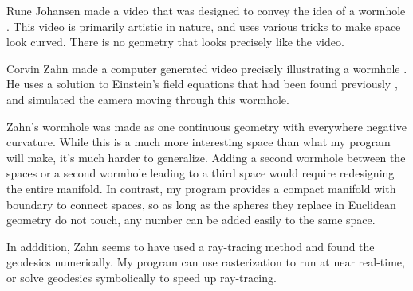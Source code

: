 Rune Johansen made a video that was designed to convey the idea of a wormhole \cite{runevision}. This video is primarily artistic in nature, and uses various tricks to make space look curved. There is no geometry that looks precisely like the video.

Corvin Zahn made a computer generated video precisely illustrating a wormhole \cite{spacetimetravel}. He uses a solution to Einstein's field equations that had been found previously \cite{WormholeSolution}, and simulated the camera moving through this wormhole.

Zahn's wormhole was made as one continuous geometry with everywhere negative curvature. While this is a much more interesting space than what my program will make, it's much harder to generalize. Adding a second wormhole between the spaces or a second wormhole leading to a third space would require redesigning the entire manifold. In contrast, my program provides a compact manifold with boundary to connect spaces, so as long as the spheres they replace in Euclidean geometry do not touch, any number can be added easily to the same space.

In adddition, Zahn seems to have used a ray-tracing method and found the geodesics numerically. My program can use rasterization to run at near real-time, or solve geodesics symbolically to speed up ray-tracing.




